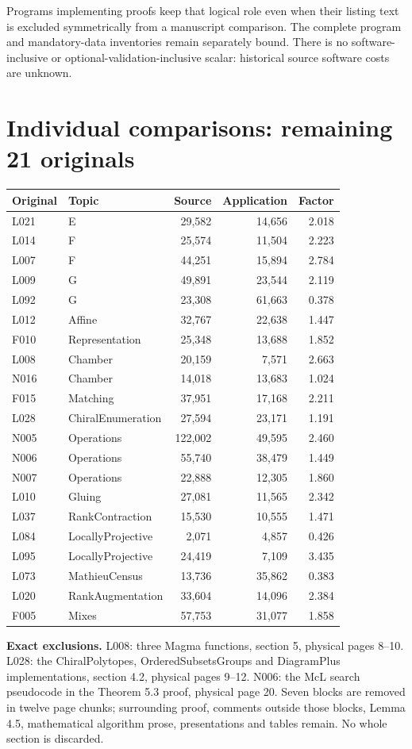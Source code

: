 \documentclass[11pt,a4paper]{article}
\begin{document}
Programs implementing proofs keep that logical role even when their listing text is excluded symmetrically from a manuscript comparison. The complete program and mandatory-data inventories remain separately bound. There is no software-inclusive or optional-validation-inclusive scalar: historical source software costs are unknown.
\newpage
\section*{Individual comparisons: remaining 21 originals}
\begin{center}\small\begin{tabular}{llrrr}\toprule
Original & Topic & Source & Application & Factor\\\midrule
L021 & E & 29,582 & 14,656 & 2.018 \\
L014 & F & 25,574 & 11,504 & 2.223 \\
L007 & F & 44,251 & 15,894 & 2.784 \\
L009 & G & 49,891 & 23,544 & 2.119 \\
L092 & G & 23,308 & 61,663 & 0.378 \\
L012 & Affine & 32,767 & 22,638 & 1.447 \\
F010 & Representation & 25,348 & 13,688 & 1.852 \\
L008 & Chamber & 20,159 & 7,571 & 2.663 \\
N016 & Chamber & 14,018 & 13,683 & 1.024 \\
F015 & Matching & 37,951 & 17,168 & 2.211 \\
L028 & ChiralEnumeration & 27,594 & 23,171 & 1.191 \\
N005 & Operations & 122,002 & 49,595 & 2.460 \\
N006 & Operations & 55,740 & 38,479 & 1.449 \\
N007 & Operations & 22,888 & 12,305 & 1.860 \\
L010 & Gluing & 27,081 & 11,565 & 2.342 \\
L037 & RankContraction & 15,530 & 10,555 & 1.471 \\
L084 & LocallyProjective & 2,071 & 4,857 & 0.426 \\
L095 & LocallyProjective & 24,419 & 7,109 & 3.435 \\
L073 & MathieuCensus & 13,736 & 35,862 & 0.383 \\
L020 & RankAugmentation & 33,604 & 14,096 & 2.384 \\
F005 & Mixes & 57,753 & 31,077 & 1.858 \\\bottomrule\end{tabular}\end{center}
\textbf{Exact exclusions.} L008: three Magma functions, section 5, physical pages 8--10. L028: the ChiralPolytopes, OrderedSubsetsGroups and DiagramPlus implementations, section 4.2, physical pages 9--12. N006: the McL search pseudocode in the Theorem 5.3 proof, physical page 20. Seven blocks are removed in twelve page chunks; surrounding proof, comments outside those blocks, Lemma 4.5, mathematical algorithm prose, presentations and tables remain. No whole section is discarded.
\end{document}
